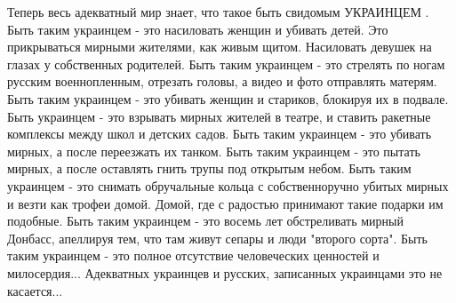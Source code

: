 Теперь весь адекватный мир знает, что такое быть свидомым УКРАИНЦЕМ . Быть
таким украинцем - это насиловать женщин и убивать детей. Это прикрываться
мирными жителями, как живым щитом. Насиловать девушек на глазах у собственных
родителей. Быть таким украинцем - это стрелять по ногам русским военнопленным,
отрезать головы, а видео и фото отправлять матерям. Быть таким украинцем - это
убивать женщин и стариков, блокируя их в подвале. Быть украинцем - это взрывать
мирных жителей в театре, и ставить ракетные комплексы между школ и детских
садов. Быть таким украинцем - это убивать мирных, а после переезжать их танком.
Быть таким украинцем - это пытать мирных, а после оставлять гнить трупы под
открытым небом. Быть таким украинцем - это снимать обручальные кольца с
собственноручно убитых мирных и везти как трофеи домой. Домой, где с радостью
принимают такие подарки им подобные. Быть таким украинцем - это восемь лет
обстреливать мирный Донбасс, апеллируя тем, что там живут сепары и люди
"второго сорта". Быть таким украинцем - это полное отсутствие человеческих
ценностей и милосердия... Адекватных украинцев и русских, записанных украинцами
это не касается...
